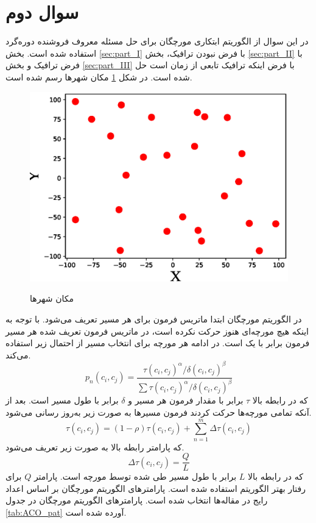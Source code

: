 \section{سوال دوم}
در این سوال از الگوریتم ابتکاری مورچگان برای حل مسئله معروف فروشنده دوره‌گرد استفاده شده است. بخش
\ref{sec:part_I}
با فرض نبودن ترافیک،
بخش
\ref{sec:part_II}
با فرض ترافیک و بخش
\ref{sec:part_III}
با فرض اینکه ترافیک تابعی از زمان است حل شده است. در شکل
\ref{fig:cities}
مکان شهر‌ها رسم شده است.
\begin{figure}[H]
	\caption{مکان شهرها} 
	\centering 
	\includegraphics[width=16cm]{../Figure/Q2/Cities} 
	\label{fig:cities}
\end{figure}


در الگوریتم مورچگان ابتدا ماتریس فرمون برای هر مسیر تعریف می‌شود. با توجه به اینکه هیچ مورچه‌ای هنوز حرکت نکرده است، در ماتریس فرمون تعریف شده هر مسیر فرمون برابر با یک است. در ادامه هر مورچه برای انتخاب مسیر از احتمال زیر استفاده می‌کند.
\begin{equation}
	p_n(c_i, c_j) = \dfrac{\tau(c_i, c_j)^{\alpha}/\delta(c_i, c_j)^{\beta}}{\sum \tau(c_i, c_j)^{\alpha}/\delta(c_i, c_j)^{\beta}}
\end{equation}
که در رابطه بالا $\tau$ برابر با مقدار فرمون هر مسیر و $\delta$ برابر با طول مسیر است. بعد از آنکه تمامی مورچه‌ها حرکت کردند فرمون مسیر‌ها به صورت زیر به‌روز رسانی می‌شود.
\begin{equation}
	\tau(c_i, c_j) = (1-\rho)\tau(c_i, c_j) + \sum_{n=1}^{m} \Delta \tau(c_i, c_j) 
\end{equation}
که پارامتر رابطه بالا به صورت زیر تعریف می‌شود.
\begin{equation}
	\Delta \tau(c_i, c_j) = \dfrac{Q}{L}
\end{equation}
که در رابطه بالا $L$ برابر با طول مسیر طی شده توسط مورچه است. 
پارامتر $Q$ برای رفتار بهتر الگوریتم استفاده شده است.
پارامترهای الگوریتم مورچگان بر اساس اعداد رایج در مقاله‌ها انتخاب شده است. پارامترهای الگوریتم مورچگان در جدول
\ref{tab:ACO_pat}
آورده شده است.

